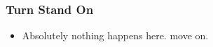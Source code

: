 

\subsubsection{Turn Stand On}
\begin{itemize}
    \item Absolutely nothing happens here. move on.
\end{itemize}


